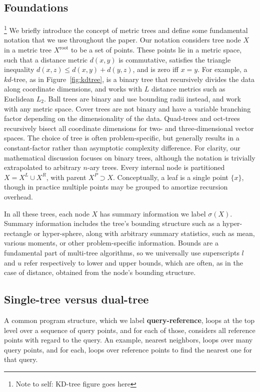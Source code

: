 \documentclass[twoside,leqno,twocolumn]{article}
\newcommand{\authornote}[1]{\footnote{Note to self: #1}}
\newcommand{\union}{\cup}
\newcommand{\fig}[1]{Figure~\ref{fig:#1}}
\newcommand{\mysub}[1]{\subsection{#1} }
\newcommand{\defterm}[1]{{\bf #1}}
\newcommand{\kdroot}[1]{#1^{\text{root}}}
\newcommand{\kdleft}[1]{#1^{\!L}}
\newcommand{\kdright}[1]{#1^{\!R}}
\newcommand{\kdparent}[1]{#1^{\!P}}
\newcommand{\dist}[2]{d(#1,#2)}
\newcommand{\outstat}{\sigma}
\begin{document}
\mysub{Foundations}
\authornote{KD-tree figure goes here}
We briefly introduce the concept of metric trees and define some fundamental notation that we use throughout the paper.
Our notation considers tree node $X$ in a metric tree $\kdroot{X}$ to be a set of points.
These points lie in a metric space, such that a distance metric $\dist{x}{y}$ is commutative, satisfies the triangle inequality $\dist{x}{z} \leq \dist{x}{y} + \dist{y}{z}$, and is zero iff $x = y$.
For example, a $kd$-tree\cite{preparata_kdtrees}, as in \fig{kdtree}, is a binary tree that recursively divides the data along coordinate dimensions, and works with $L$ distance metrics such as Euclidean $L_2$.
Ball trees are binary and use bounding radii instead, and work with any metric space.
Cover trees are not binary and have a variable branching factor depending on the dimensionality of the data.
Quad-trees and oct-trees recursively bisect all coordinate dimensions for two- and three-dimensional vector spaces.
The choice of tree is often problem-specific, but generally results in a constant-factor rather than asymptotic complexity difference.
For clarity, our mathematical discussion focuses on binary trees, although the notation is trivially extrapolated to arbitrary $n$-ary trees.
Every internal node is partitioned $X = \kdleft{X} \union \kdright{X}$, with parent $\kdparent{X} \supset X$.
Conceptually, a leaf is a single point $\{x\}$, though in practice multiple points may be grouped to amortize recursion overhead.

In all these trees, each node $X$ has summary information we label $\outstat(X)$.
Summary information includes the tree's bounding structure such as a hyper-rectangle or hyper-sphere, along with arbitrary summary statistics, such as mean, various moments, or other problem-specific information.
Bounds are a fundamental part of multi-tree algorithms, so we universally use superscripts $l$ and $u$ refer respectively to lower and upper bounds, which are often, as in the case of distance, obtained from the node's bounding structure.

\mysub{Single-tree versus dual-tree}
A common program structure, which we label \defterm{query-reference}, loops at the top level over a sequence of query points, and for each of those, considers all reference points with regard to the query.
An example, nearest neighbors, loops over many query points, and for each, loops over reference points to find the nearest one for that query.
\end{document}

